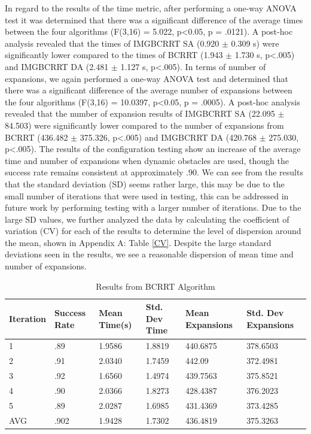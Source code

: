 \documentclass{article}
\begin{document}
In regard to the results of the time metric, after performing a one-way ANOVA test it was determined that there was a significant difference of the average times between the four algorithms (F(3,16) = 5.022, p<0.05, p = .0121). A post-hoc analysis revealed that the times of IMGBCRRT SA (0.920 $\pm$  0.309 s) were significantly lower compared to the times of BCRRT (1.943 $\pm$  1.730 s, p<.005) and IMGBCRRT DA (2.481 $\pm$  1.127 s, p<.005).  In terms of number of expansions, we again performed a one-way ANOVA test and determined that there was a significant difference of the average number of expansions between the four algorithms  (F(3,16) = 10.0397, p<0.05, p = .0005). A post-hoc analysis revealed that the number of expansion results of IMGBCRRT SA (22.095 $\pm$  84.503) were significantly lower compared to the number of expansions from BCRRT (436.482 $\pm$  375.326, p<.005) and IMGBCRRT DA (420.768 $\pm$  275.030, p<.005). The results of the configuration testing show an increase of the average time and number of expansions when dynamic obstacles are used, though the success rate remains consistent at approximately .90. 
We can see from the results that the standard deviation (SD) seems rather large, this may be due to the small number of iterations that were used in testing, this can be addressed in future work by performing testing with a larger number of iterations. Due to the large SD values, we further analyzed the data by calculating the coefficient of variation (CV) for each of the results to determine the level of dispersion around the mean, shown in Appendix A: Table \ref{CV}. Despite the large standard deviations seen in the results, we see a reasonable dispersion of mean time and number of expansions. 

\begin{table}[hbt!]
  \caption{Results from BCRRT Algorithm}
  \label{BCRRT Results}
  \centering
  \begin{tabular}{llllll}
    \cmidrule(r){1-6}
   Iteration & Success Rate & Mean Time(s) & Std. Dev Time & Mean Expansions & Std. Dev Expansions\\
    \midrule
    1 & .89 & 1.9586 & 1.8819 & 440.6875 & 378.6503 \\
    2 & .91 & 2.0340 & 1.7459 & 442.09 & 372.4981 \\
    3 & .92 & 1.6560 & 1.4974 & 439.7563 & 375.8521 \\
    4 & .90 & 2.0366 & 1.8273 & 428.4387 & 376.2023 \\
    5 & .89 & 2.0287 & 1.6985 & 431.4369 & 373.4285 \\
 \midrule
  AVG & .902 & 1.9428 & 1.7302 & 436.4819 & 375.3263 \\
    \bottomrule
  \end{tabular}
\end{table}
\end{document}
